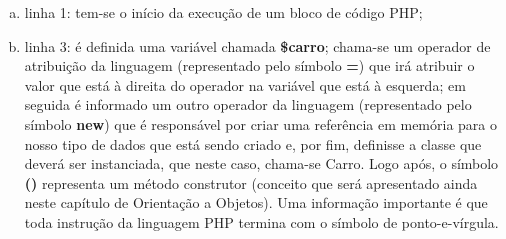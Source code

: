 \begin{enumerate}[a)]
    \item linha 1: tem-se o início da execução de um bloco de código PHP;
    \item linha 3: é definida uma variável chamada \textbf{\$carro};
    chama-se um operador de atribuição da linguagem (representado pelo símbolo
    \textbf{=}) que irá atribuir o valor que está à direita do operador na
    variável que está à esquerda; em seguida é informado um outro operador da
    linguagem (representado pelo símbolo \textbf{new}) que é responsável por
    criar uma referência em memória para o nosso tipo de dados que está sendo
    criado e, por fim, definisse a classe que deverá ser instanciada, que neste
    caso, chama-se Carro. Logo após, o símbolo \textbf{()} representa um método
    construtor (conceito que será apresentado ainda neste capítulo de Orientação
    a Objetos).
    Uma informação importante é que toda instrução da linguagem PHP termina
    com o símbolo de ponto-e-vírgula.
\end{enumerate}